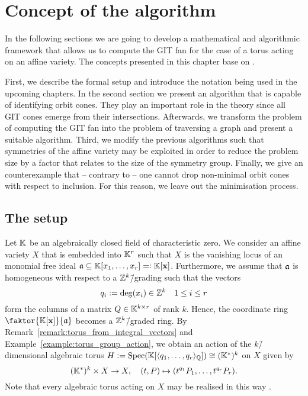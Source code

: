 



\label{algorithm:main}

\chapter{Concept of the algorithm}
\label{chap:algorithm}

In the following sections we are going to develop a mathematical and algorithmic framework that allows us to compute the GIT fan for the case of a torus acting on an affine variety. The concepts presented in this chapter base on \cite{gitfan_symmetry, gitfan}.

First, we describe the formal setup and introduce the notation being used in the upcoming chapters. In the second section we present an algorithm that is capable of identifying orbit cones. They play an important role in the theory since all GIT cones emerge from their intersections. Afterwards, we transform the problem of computing the GIT fan into the problem of traversing a graph and present a suitable algorithm. Third, we modify the previous algorithms such that symmetries of the affine variety may be exploited in order to reduce the problem size by a factor that relates to the size of the symmetry group. Finally, we give an counterexample that -- contrary to \cite{gitfan_symmetry} -- one cannot drop non-minimal orbit cones with respect to inclusion. For this reason, we leave out the minimisation process.

\section{The setup}
\label{section:setup}

Let $\mathbb{K}$ be an algebraically closed field of characteristic zero.
%
We consider an affine variety $X$ that is embedded into $\mathbb{K}^r$ such that $X$ is the vanishing locus of an monomial free ideal $\mathfrak{a}\subseteq \mathbb{K}[x_1,\dots,x_r]=\mathrel{\mathop:} \mathbb{K}[\mathbf{x}]$.
%
%
%
Furthermore, we assume that $\mathfrak{a}$ is homogeneous with respect to a $\mathbb{Z}^k$\=/grading such that the vectors 
$$q_i\mathrel{\mathop:}= \deg(x_i)\in\mathbb{Z}^k\quad 1\leq i \leq r$$
form the columns of a matrix $Q\in\mathbb{K}^{k\times r}$ of rank $k$.
%
%
%
Hence, the coordinate ring $\faktor{\field[\mathbf{x}]}{\ideal}$ becomes a $\mathbb{Z}^k$\=/graded ring. By Remark~\ref{remark:torus_from_integral_vectors} and Example~\ref{example:torus_group_action}, we obtain an action of the $k$\=/dimensional algebraic torus $H \mathrel{\mathop:}= \text{Spec}(\mathbb{K}[\langle q_1,\dots,q_r\rangle_{\mathbb{Q}}])\cong (\mathbb{K}^*)^k$ on $X$ given by
%
$$(\mathbb{K}^*)^k \times X \rightarrow X,\quad (t,P) \mapsto (t^{q_1}P_1,\dots,t^{q_r}P_r).$$
Note that every algebraic torus acting on $X$ may be realised in this way .

